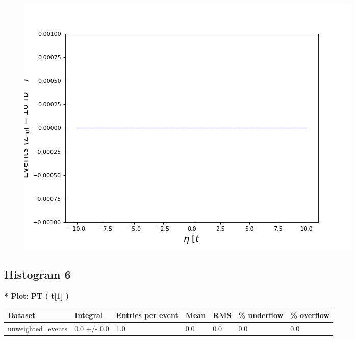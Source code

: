\documentclass[a4paper, 10pt]{article}
\begin{document}
\begin{figure}[H]
  \begin{center}
    \includegraphics[scale=0.45]{selection_4.png}\\
\caption{   }
  \end{center}
\end{figure}
      \newpage
\subsection{ Histogram 6}

\textbf{* Plot: PT ( t[1] ) }\\
   \begin{table}[H]
  \begin{center}
    \begin{tabular}{|m{23.0mm}|m{23.0mm}|m{18.0mm}|m{19.0mm}|m{19.0mm}|m{19.0mm}|m{19.0mm}|}
      \hline
      {\cellcolor{yellow}         Dataset}& {\cellcolor{yellow}         Integral}& {\cellcolor{yellow}         Entries per event}& {\cellcolor{yellow}         Mean}& {\cellcolor{yellow}         RMS}& {\cellcolor{yellow}         \% underflow}& {\cellcolor{yellow}         \% overflow}\\
      \hline
      {\cellcolor{white}         unweighted\_events}& {\cellcolor{white}         0.0 +/\-- 0.0}& {\cellcolor{white}         1.0}& {\cellcolor{white}         0.0}& {\cellcolor{white}         0.0}& {\cellcolor{green}         0.0}& {\cellcolor{green}         0.0}\\
\hline
    \end{tabular}
  \end{center}
\end{table}
\end{document}
